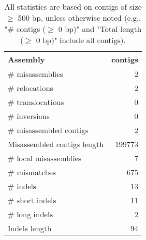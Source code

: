 \documentclass[12pt,a4paper]{article}
\begin{document}
\begin{table}[ht]
\begin{center}
\caption{All statistics are based on contigs of size $\geq$ 500 bp, unless otherwise noted (e.g., "\# contigs ($\geq$ 0 bp)" and "Total length ($\geq$ 0 bp)" include all contigs).}
\begin{tabular}{|l*{1}{|r}|}
\hline
Assembly & contigs \\ \hline
\# misassemblies & 2 \\ \hline
\hspace{5mm}\# relocations & 2 \\ \hline
\hspace{5mm}\# translocations & 0 \\ \hline
\hspace{5mm}\# inversions & 0 \\ \hline
\# misassembled contigs & 2 \\ \hline
Misassembled contigs length & 199773 \\ \hline
\# local misassemblies & 7 \\ \hline
\# mismatches & 675 \\ \hline
\# indels & 13 \\ \hline
\hspace{5mm}\# short indels & 11 \\ \hline
\hspace{5mm}\# long indels & 2 \\ \hline
Indels length & 94 \\ \hline
\end{tabular}
\end{center}
\end{table}
\end{document}

